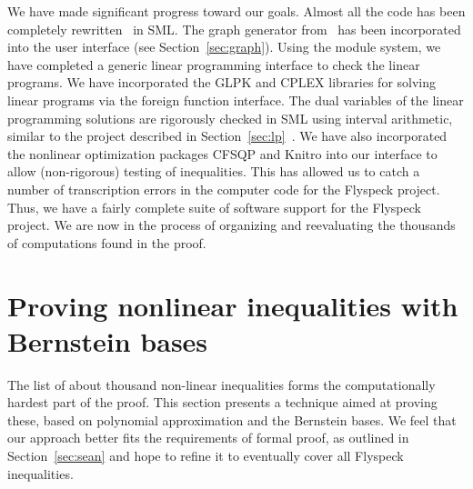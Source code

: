 \documentclass[11pt]{amsart}
\begin{document}
We have made significant progress toward our goals. Almost all the
code has been completely rewritten~\cite{McLaughlin:2008:KeplerCode} in
SML. The graph generator
from~\cite{NipkowBS-IJCAR06} has been incorporated into the user
interface (see Section~\ref{sec:graph}). Using the module system, we have completed a generic linear
programming interface to check the linear programs. We have
incorporated the GLPK and CPLEX libraries for solving linear programs
via the foreign function interface. The dual variables of the linear
programming solutions are rigorously checked in SML using interval
arithmetic, similar to the project described in Section~\ref{sec:lp}~\cite{Obua:2005:Thesis}. We have
also incorporated the nonlinear optimization packages CFSQP and Knitro
into our interface to allow (non-rigorous) testing of inequalities.
This has allowed us to catch a number of transcription errors in
the computer code for the Flyspeck project. 
Thus, we have a fairly complete suite
of software support for the Flyspeck project. We are now in the
process of organizing and reevaluating the thousands of computations
found in the proof.




\section{Proving nonlinear inequalities with Bernstein bases}
\label{sec:zumkeller}

The list of about thousand non-linear inequalities forms the computationally
hardest part of the proof. This section presents a technique aimed at proving
these, based on polynomial approximation and the Bernstein bases. We feel that
our approach better fits the requirements of formal proof, as outlined in
Section~\ref{sec:sean} and hope to refine it to eventually cover all Flyspeck
inequalities.
\end{document}
